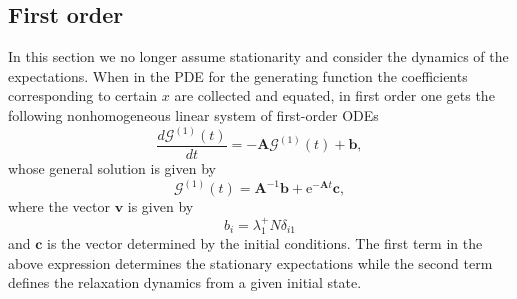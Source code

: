 \documentclass[a4paper, 11pt]{article}
\begin{document}
\subsection{First order}\label{subsec:o1_nonstat_problem}
In this section we no longer assume stationarity and consider the dynamics of the expectations. When in the PDE for the generating function the coefficients corresponding to certain $x$ are collected and equated, in first order one gets the following nonhomogeneous linear system of first-order ODEs
\begin{equation}\label{o1_system}
\frac{d\boldsymbol{\mathcal G}^{(1)}(t)}{dt} = -\mathbf A \boldsymbol{\mathcal G}^{(1)}(t) + \mathbf b,
\end{equation}
whose general solution is given by
\begin{equation}\label{general_solution}
  \boldsymbol{\mathcal G}^{(1)}(t) = \mathbf A^{-1}\mathbf b + \mathrm e^{-\mathbf A t}\mathbf c,
\end{equation}
where the vector $\mathbf v$ is given by
\begin{equation}\label{rhs_vector}
  b_i=\lambda^+_1N\delta_{i1}
\end{equation}
and $\mathbf c$ is the vector determined by the initial conditions. The first term in the above expression determines the stationary expectations while the second term defines the relaxation dynamics from a given initial state.
\end{document}
